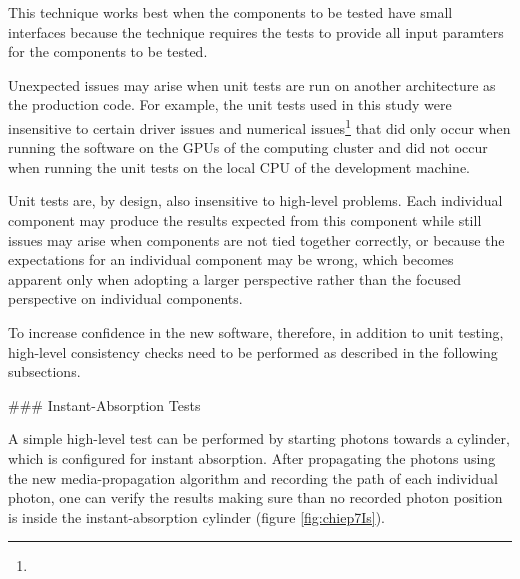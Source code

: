 This technique works best when the components to be tested have small interfaces because the technique requires the tests to provide all input paramters for the components to be tested.

Unexpected issues may arise when unit tests are run on another architecture as the production code. For example, the unit tests used in this study were insensitive to certain driver issues and numerical issues\footnote{} that did only occur when running the software on the GPUs of the computing cluster and did not occur when running the unit tests on the local CPU of the development machine.

Unit tests are, by design, also insensitive to high-level problems. Each individual component may produce the results expected from this component while still issues may arise when components are not tied together correctly, or because the expectations for an individual component may be wrong, which becomes apparent only when adopting a larger perspective rather than the focused perspective on individual components.

To increase confidence in the new software, therefore, in addition to unit testing, high-level consistency checks need to be performed as described in the following subsections.


### Instant-Absorption Tests

A simple high-level test can be performed by starting photons towards a cylinder, which is configured for instant absorption. After propagating the photons using the new media-propagation algorithm and recording the path of each individual photon, one can verify the results making sure than no recorded photon position is inside the instant-absorption cylinder (figure \ref{fig:chiep7Is}).


